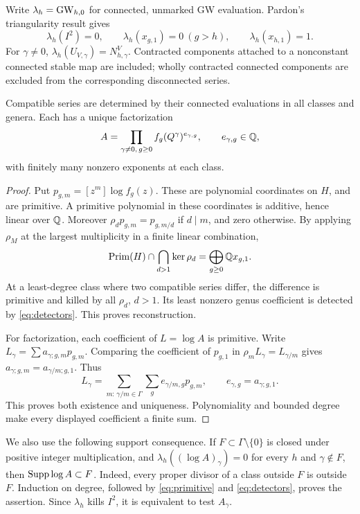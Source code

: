 Write $\lambda_h=\operatorname{GW}_{h,0}$ for connected, unmarked GW evaluation.
Pardon's triangularity result \cite[Lemma 7.7]{Pardon} gives
\begin{equation}\label{eq:detectors}
 \lambda_h(I^2)=0,\qquad \lambda_h(x_{g,1})=0\ (g>h),
 \qquad \lambda_h(x_{h,1})=1.
\end{equation}
For $\gamma\ne0$, $\lambda_h(U_{V,\gamma})=N^V_{h,\gamma}$.
Contracted components attached to a nonconstant connected stable map
are included; wholly contracted connected components are excluded from
the corresponding disconnected series.

\begin{lemma}\label{lem:formal}
Compatible series are determined by their connected evaluations in all
classes and genera. Each has a unique factorization
\begin{equation}\label{eq:factor}
 A=\prod_{\gamma\ne0,\,g\ge0}f_g(Q^\gamma)^{e_{\gamma,g}},
 \qquad e_{\gamma,g}\in\mathbb Q,
\end{equation}
with finitely many nonzero exponents at each class.
\end{lemma}
\begin{proof}
Put $p_{g,m}=[z^m]\log f_g(z)$. These are polynomial coordinates on
$H$, and are primitive. A primitive polynomial in these coordinates is
additive, hence linear over $\mathbb Q$. Moreover
$\rho_dp_{g,m}=p_{g,m/d}$ if $d\mid m$, and zero otherwise. By applying
$\rho_M$ at the largest multiplicity in a finite linear combination,
\begin{equation}\label{eq:primitive}
 \operatorname{Prim}(H)\cap\bigcap_{d>1}\ker\rho_d
   =\bigoplus_{g\ge0}\mathbb Q x_{g,1}.
\end{equation}
At a least-degree class where two compatible series differ, the
difference is primitive and killed by all $\rho_d$, $d>1$. Its least
nonzero genus coefficient is detected by \eqref{eq:detectors}.
This proves reconstruction.

For factorization, each coefficient of $L=\log A$ is primitive.
Write $L_\gamma=\sum a_{\gamma;g,m}p_{g,m}$. Comparing the coefficient
of $p_{g,1}$ in $\rho_mL_\gamma=L_{\gamma/m}$ gives
$a_{\gamma;g,m}=a_{\gamma/m;g,1}$. Thus
\[
 L_\gamma=\sum_{m:\,\gamma/m\in\Gamma}\sum_g
 e_{\gamma/m,g}p_{g,m},\qquad e_{\gamma,g}=a_{\gamma;g,1}.
\]
This proves both existence and uniqueness. Polynomiality and bounded
degree make every displayed coefficient a finite sum.
\end{proof}

We also use the following support consequence. If $F\subset
\Gamma\setminus\{0\}$ is closed under positive integer multiplication,
and $\lambda_h((\log A)_\gamma)=0$ for every $h$ and $\gamma\notin F$,
then $\operatorname{Supp}\log A\subset F$. Indeed, every proper divisor of a class
outside $F$ is outside $F$. Induction on degree, followed by
\eqref{eq:primitive} and \eqref{eq:detectors}, proves the assertion.
Since $\lambda_h$ kills $I^2$, it is equivalent to test $A_\gamma$.

